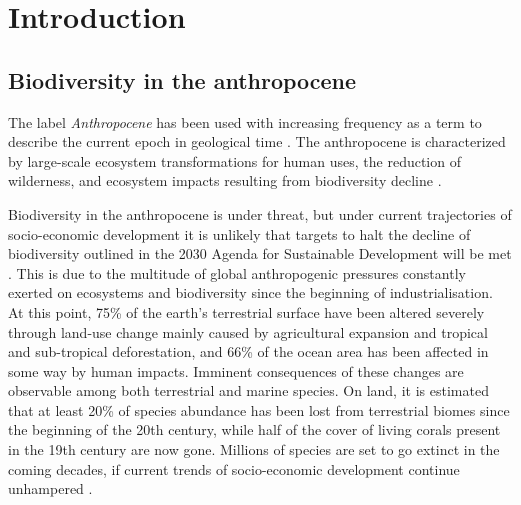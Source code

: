 \documentclass[titlesmallcaps,copyrightpage]{uomthesis}\usepackage[]{graphicx}\usepackage[]{color}
\begin{document}
\tableofcontents
\clearpage{\pagestyle{empty}\cleardoublepage}

\listoffigures
\clearpage{\pagestyle{empty}\cleardoublepage}

\listoftables
\clearpage{\pagestyle{empty}\cleardoublepage}

\mainmatter


\chapter{Introduction}\label{ch1}
\newpage

\section{Biodiversity in the anthropocene}

The label \textit{Anthropocene} has been used with increasing frequency as a term to describe the current epoch in geological time \citep{corlett_anthropocene_2015, seddon_biodiversity_2016, pearson_biodiversity_2020}. The anthropocene is characterized by large-scale ecosystem transformations for human uses, the reduction of wilderness, and ecosystem impacts resulting from biodiversity decline \citep{seddon_biodiversity_2016}. 

Biodiversity in the anthropocene is under threat, but under current trajectories of socio-economic development it is unlikely that targets to halt the decline of biodiversity outlined in the 2030 Agenda for Sustainable Development will be met \citep{ipbes_summary_2019, un_general_assembly_transforming_2015}. This is due to the multitude of global anthropogenic pressures constantly exerted on ecosystems and biodiversity since the beginning of industrialisation. At this point, 75\% of the earth's terrestrial surface have been altered severely through land-use change mainly caused by agricultural expansion and tropical and sub-tropical deforestation, and 66\% of the ocean area has been affected in some way by human impacts. Imminent consequences of these changes are observable among both terrestrial and marine species. On land, it is estimated that at least 20\% of species abundance has been lost from terrestrial biomes since the beginning of the 20th century, while half of the cover of living corals present in the 19th century are now gone. Millions of species are set to go extinct in the coming decades, if current trends of socio-economic development continue unhampered \citep{ipbes_summary_2019}.
\end{document}
